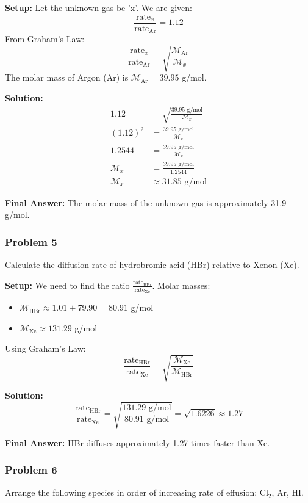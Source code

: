 \documentclass{article}
\begin{document}
\textbf{Setup:}
Let the unknown gas be 'x'. We are given:
\[ \frac{\text{rate}_x}{\text{rate}_{\text{Ar}}} = 1.12 \]
From Graham's Law:
\[ \frac{\text{rate}_x}{\text{rate}_{\text{Ar}}} = \sqrt{\frac{\mathcal{M}_{\text{Ar}}}{\mathcal{M}_x}} \]
The molar mass of Argon (Ar) is $\mathcal{M}_{\text{Ar}} = 39.95$ g/mol.

\textbf{Solution:}
\begin{align*}
    1.12 &= \sqrt{\frac{39.95 \text{ g/mol}}{\mathcal{M}_x}} \\
    (1.12)^2 &= \frac{39.95 \text{ g/mol}}{\mathcal{M}_x} \\
    1.2544 &= \frac{39.95 \text{ g/mol}}{\mathcal{M}_x} \\
    \mathcal{M}_x &= \frac{39.95 \text{ g/mol}}{1.2544} \\
    \mathcal{M}_x &\approx 31.85 \text{ g/mol}
\end{align*}

\textbf{Final Answer:} The molar mass of the unknown gas is approximately 31.9 g/mol.

\subsubsection{Problem 5}
Calculate the diffusion rate of hydrobromic acid (HBr) relative to Xenon (Xe).

\textbf{Setup:}
We need to find the ratio $\frac{\text{rate}_{\text{HBr}}}{\text{rate}_{\text{Xe}}}$.
Molar masses:
\begin{itemize}
    \item $\mathcal{M}_{\text{HBr}} \approx 1.01 + 79.90 = 80.91$ g/mol
    \item $\mathcal{M}_{\text{Xe}} \approx 131.29$ g/mol
\end{itemize}
Using Graham's Law:
\[ \frac{\text{rate}_{\text{HBr}}}{\text{rate}_{\text{Xe}}} = \sqrt{\frac{\mathcal{M}_{\text{Xe}}}{\mathcal{M}_{\text{HBr}}}} \]

\textbf{Solution:}
\[ \frac{\text{rate}_{\text{HBr}}}{\text{rate}_{\text{Xe}}} = \sqrt{\frac{131.29 \text{ g/mol}}{80.91 \text{ g/mol}}} = \sqrt{1.6226} \approx 1.27 \]

\textbf{Final Answer:} HBr diffuses approximately 1.27 times faster than Xe.

\subsubsection{Problem 6}
Arrange the following species in order of increasing rate of effusion: Cl$_2$, Ar, HI.
\end{document}
